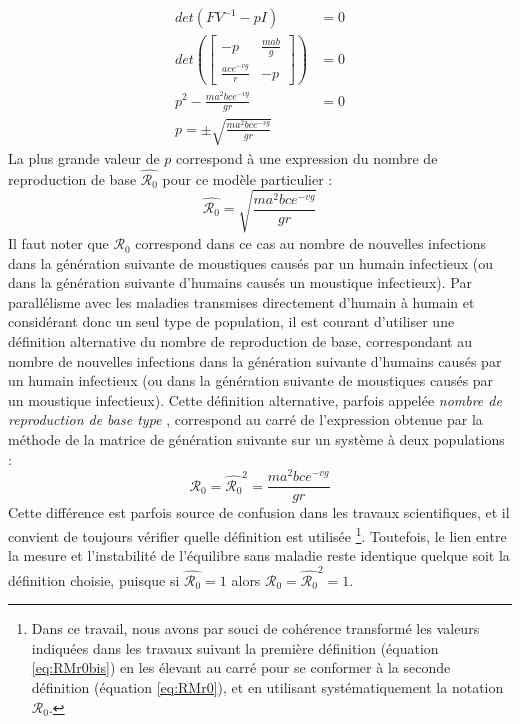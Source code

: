 \begin{align}
det(FV^{-1}-pI) &= 0 \\
det \left( \begin{bmatrix} -p & \frac{mab}{g}  \\ \frac{ace^{-vg}}{r} & -p \end{bmatrix} \right) &= 0 \\
p^2 - \frac{ma^2bce^{-vg}}{gr} &= 0 \\
p = \pm \sqrt{\frac{ma^2bce^{-vg}}{gr}}
\end{align}
La plus grande valeur de $p$ correspond à une expression du nombre de reproduction de base $\hat{\mathcal{R}_0}$ pour ce modèle particulier :
\begin{equation}
\label{eq:RMr0bis}
\hat{\mathcal{R}_0} = \sqrt{\frac{ma^2bce^{-vg}}{gr}}
\end{equation}
Il faut noter que $\hat{\mathcal{R}_0}$ correspond dans ce cas au nombre de nouvelles infections dans la génération suivante de moustiques causés par un humain infectieux (ou dans la génération suivante d'humains causés un moustique infectieux). 
Par parallélisme avec les maladies transmises directement d'humain à humain et considérant donc un seul type de population, il est courant d'utiliser une définition alternative du nombre de reproduction de base, correspondant au nombre de nouvelles infections dans la génération suivante d'humains causés par un humain infectieux (ou dans la génération suivante de moustiques causés par un moustique infectieux). Cette définition alternative, parfois appelée {\em nombre de reproduction de base type} \cite{heesterbeek2007type}, correspond au carré de l'expression obtenue par la méthode de la matrice de génération suivante sur un système à deux populations :
\begin{equation}
\label{eq:RMr0}
\mathcal{R}_0 = \hat{\mathcal{R}_0}^2 = \frac{ma^2bce^{-vg}}{gr}
\end{equation}
Cette différence est parfois source de confusion dans les travaux scientifiques, et il convient de toujours vérifier quelle définition est utilisée \footnote{Dans ce travail, nous avons par souci de cohérence transformé les valeurs indiquées dans les travaux suivant la première définition (équation \ref{eq:RMr0bis}) en les élevant au carré pour se conformer à la seconde définition  (équation \ref{eq:RMr0}), et en utilisant systématiquement la notation $\mathcal{R}_0$.}.
Toutefois, le lien entre la mesure et l'instabilité de l'équilibre sans maladie reste identique quelque soit la définition choisie, puisque si $\hat{\mathcal{R}_0} = 1$ alors $ \mathcal{R}_0 = \hat{\mathcal{R}_0}^2 = 1$. 
